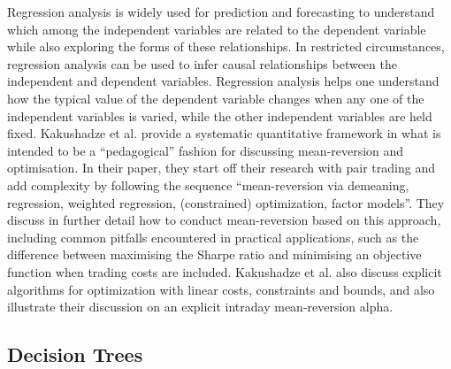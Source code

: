Regression analysis is widely used for prediction and forecasting to understand which among the independent variables are related to the dependent variable while also exploring the forms of these relationships. In restricted circumstances, regression analysis can be used to infer causal relationships between the independent and dependent variables. Regression analysis helps one understand how the typical value of the dependent variable changes when any one of the independent variables is varied, while the other independent variables are held fixed. Kakushadze et al. provide a systematic quantitative framework in what is intended to be a “pedagogical” fashion for discussing mean-reversion and optimisation.\cite{Kakushadze:2015aa} In their paper, they start off their research with pair trading and add complexity by following the sequence “mean-reversion via demeaning, regression, weighted regression, (constrained) optimization, factor models”. They discuss in further detail how to conduct mean-reversion based on this approach, including common pitfalls encountered in practical applications, such as the difference between maximising the Sharpe ratio and minimising an objective function when trading costs are included. Kakushadze et al. also discuss explicit algorithms for optimization with linear costs, constraints and bounds, and also illustrate their discussion on an explicit intraday mean-reversion alpha.

\subsection{Decision Trees}


